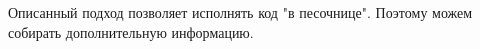 \begin{frame}
\frametitle{\insertsection} 
\framesubtitle{\insertsubsection}
Описанный подход позволяет исполнять код "в песочнице". Поэтому можем собирать дополнительную информацию.
\end{frame}
